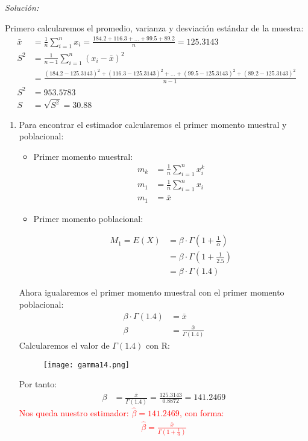 \documentclass[12pt]{article}
\newenvironment{sol}
    {\emph{Solución:}
    }
    {
    }
\begin{document}
\begin{sol}
Primero calcularemos el promedio, varianza y desviación estándar de la muestra:
\begin{align*}
\bar{x} &= \frac{1}{n} \sum_{i=1}^{n}x_i=\frac{184.2+116.3+...+99.5+89.2}{n} =  125.3143 \\
S^2 &= \frac{1}{n-1} \sum_{i=1}^{n} (x_i - \bar{x})^2 \\
&=\frac{(184.2-125.3143)^2 + (116.3-125.3143)^2 +...+(99.5-125.3143)^2 +(89.2-125.3143)^2 }{n-1}\\
S^2 &=953.5783 \\
S &= \sqrt{S^2}=30.88
\end{align*}
\begin{enumerate}[label=\alph*)] %
    
\item Para encontrar el estimador calcularemos el primer momento muestral y poblacional:
\begin{itemize}
\item Primer momento muestral:
\begin{align*}
	m_k &= \frac{1}{n} \sum_{i=1}^{n}x_i^k \\
	m_1 &= \frac{1}{n} \sum_{i=1}^{n}x_i \\
	m_1 &= \bar{x}
\end{align*}

\pagebreak

\item Primer momento poblacional:

\begin{align*}
M_1 = E(X) &= \beta \cdot \Gamma(1+\frac{1}{\alpha}) \\
 &= \beta \cdot \Gamma (1+\frac{1}{2.5}) \\
 &= \beta \cdot \Gamma(1.4)
\end{align*}	
\end{itemize}
Ahora igualaremos el primer momento muestral con el primer momento poblacional:
\begin{align*}
\beta \cdot \Gamma(1.4) &= \bar{x}\\
\beta &= \frac{\bar{x}}{\Gamma(1.4)}
\end{align*}
Calcularemos el valor de $\Gamma(1.4)$ con R:
\begin{figure}[h]  %
    \centering      %
    \texttt{[image: gamma14.png]} 
\end{figure}
Por tanto:
\begin{align*}
\beta &= \frac{\bar{x}}{\Gamma(1.4)}= \frac{125.3143}{0.8872}=141.2469
\end{align*}
\textcolor{red}{%
    Nos queda nuestro estimador: 
    \begin{math}
       \hat{\beta} = 141.2469
    \end{math}, con forma:
    \begin{align*}
       \hat{\beta} = \frac{\bar{x}}{\Gamma\left(1+\frac{1}{\alpha}\right)}
    \end{align*}    
}


\end{enumerate}
\end{sol}
\end{document}
